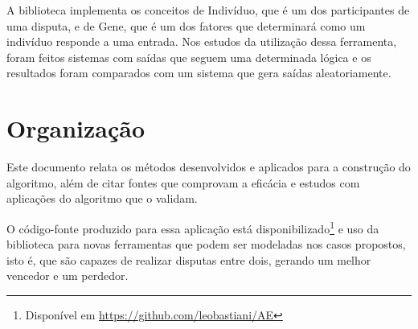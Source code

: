 A biblioteca implementa os conceitos de Indivíduo, que é um dos participantes de uma disputa, e de Gene, que é um dos fatores que determinará como um indivíduo responde a uma entrada. Nos estudos da utilização dessa ferramenta, foram feitos sistemas com saídas que seguem uma determinada lógica e os resultados foram comparados com um sistema que gera saídas aleatoriamente.

\section{Organização}

Este documento relata os métodos desenvolvidos e aplicados para a construção do algoritmo, além de citar fontes que comprovam a eficácia e estudos com aplicações do algoritmo que o validam.

O código-fonte produzido para essa aplicação está disponibilizado\footnote{Disponível em \url{https://github.com/leobastiani/AE}} e uso da biblioteca para novas ferramentas que podem ser modeladas nos casos propostos, isto é, que são capazes de realizar disputas entre dois, gerando um melhor vencedor e um perdedor.
